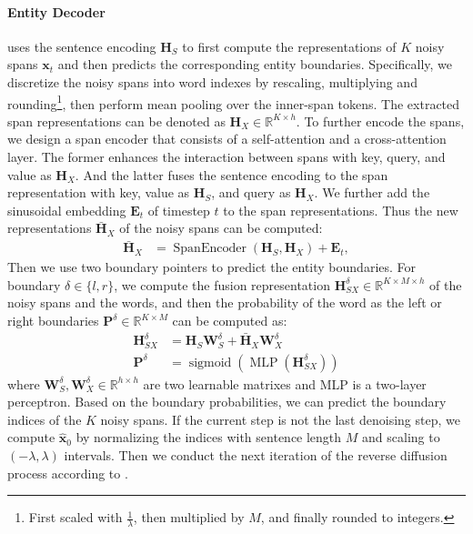 \documentclass[11pt]{article}
\begin{document}
\paragraph{Entity Decoder} uses the sentence encoding $\mathbf{H}_S$ to first compute the representations of $K$ noisy spans $\mathbf{x}_t$ and then predicts the corresponding entity boundaries.
Specifically, we discretize the noisy spans into word indexes by rescaling, multiplying and rounding\footnote{\;First scaled with $\frac{1}{\lambda}$, then multiplied by $M$, and finally rounded to integers.}, then perform mean pooling over the inner-span tokens. The extracted span representations can be denoted as $\mathbf{H}_{{X}} \in \mathbb{R}^{K\times h}$. 
To further encode the spans, we design a span encoder that consists of a self-attention and a cross-attention layer. The former enhances the interaction between spans with key, query, and value as $\mathbf{H}_{{X}}$.  And the latter fuses the sentence encoding to the span representation with key, value as $\mathbf{H}_S$, and query as $\mathbf{H}_{{X}}$. 
We further add the sinusoidal embedding $\mathbf{E}_t$ \citep{NIPS2017_3f5ee243} of timestep $t$ to the span representations. 
Thus the new representations $\bar{\mathbf{H}}_{{X}}$ of the noisy spans can be computed:
\begin{align*}
        \bar{\mathbf{H}}_{{X}}&=\operatorname{SpanEncoder}(\mathbf{H}_S, \mathbf{H}_{{X}}) + \mathbf{E}_t ,
\end{align*}
Then we use two boundary pointers to predict the entity boundaries. For boundary $\delta\in\{l, r\}$, we compute the fusion representation $\mathbf{H}^{\delta}_{SX} \in \mathbb{R}^{K\times M \times h}$ of the noisy spans and the words, and then the probability of the word as the left or right boundaries $\mathbf{P}^{\delta}\in \mathbb{R}^{K\times M}$ can be computed as:
\begin{align*}
    \mathbf{H}^{\delta}_{SX}&=\mathbf{H}_S \mathbf{W}^{\delta}_S+\bar{\mathbf{H}}_{X} \mathbf{W}^{\delta}_X \\
    \mathbf{P}^{\delta}&=\operatorname{sigmoid}(\operatorname{MLP}(\mathbf{H}^{\delta}_{SX}))
\end{align*}
where $\mathbf{W}^{\delta}_S,\mathbf{W}^{\delta}_X \in \mathbb{R}^{h\times h}$ are two learnable matrixes and MLP is a two-layer perceptron. Based on the boundary probabilities, we can predict the boundary indices of the $K$ noisy spans.
If the current step is not the last denoising step, we compute $\mathbf{\hat{x}}_0$ by normalizing the indices with sentence length $M$ and scaling to $(-\lambda, \lambda)$ intervals. Then we conduct the next iteration of the reverse diffusion process according to .
\end{document}
